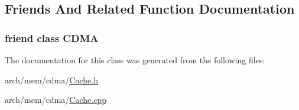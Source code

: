 \subsection{Friends And Related Function Documentation}
\hypertarget{class_simulator_1_1_c_d_m_a_1_1_cache_add415c7c29b0f2d422db4e084c6688e3}{
\subsubsection[{C\+D\+M\+A}]{\setlength{\rightskip}{0pt plus 5cm}friend class {\bf C\+D\+M\+A}\hspace{0.3cm}{\ttfamily [friend]}}}\label{class_simulator_1_1_c_d_m_a_1_1_cache_add415c7c29b0f2d422db4e084c6688e3}


The documentation for this class was generated from the following files\+:\begin{DoxyCompactItemize}
\item 
arch/mem/cdma/\hyperlink{cdma_2_cache_8h}{Cache.\+h}\item 
arch/mem/cdma/\hyperlink{cdma_2_cache_8cpp}{Cache.\+cpp}\end{DoxyCompactItemize}

